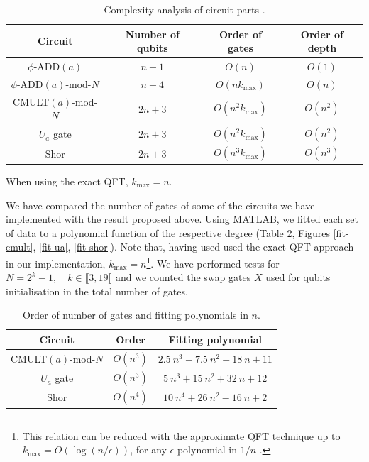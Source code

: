 \documentclass[a4paper, 10pt]{article}
\numberwithin{equation}{section}
\numberwithin{figure}{section}
\numberwithin{table}{section}
\begin{document}
\begin{table}[h!]
	\centering
	\caption{Complexity analysis of circuit parts \cite{beauregard}.}
		\label{table-complexity}
		\begin{tabular}{|c|c|c|c|}
			\hline
			Circuit            		 & Number of qubits & Order of gates & Order of depth \\ \hline
			$\phi$-ADD$(a)$          & $n+1$            & $O(n)$         & $O(1)$         \\ 
			$\phi$-ADD$(a)$-mod-$N$  & $n+4$            & $O(nk_{\max})$   & $O(n)$         \\ 
			CMULT$(a)$-mod-$N$    	 & $2n+3$           & $O(n^2k_{\max})$ & $O(n^2)$       \\ 
			$U_a$ gate            	 & $2n+3$           & $O(n^2k_{\max})$ & $O(n^2)$       \\ 
			Shor                  	 & $2n+3$           & $O(n^3k_{\max})$ & $O(n^3)$       \\ \hline
		\end{tabular}
		When using the exact QFT, $k_{\max}=n$.
\end{table}

We have compared the number of gates of some of the circuits we have implemented with the result proposed above. Using MATLAB, we fitted each set of data to a polynomial function of the respective degree (Table \ref{table-results}, Figures \ref{fit-cmult}, \ref{fit-ua}, \ref{fit-shor}). Note that, having used used the exact QFT approach in our implementation, $k_{\max}=n$\footnote{This relation can be reduced with the approximate QFT technique up to $k_{\max}=O(\log(n/\epsilon))$, for any $\epsilon$ polynomial in $1/n$ \cite{beauregard}.}. We have performed tests for $N=2^{k}-1,\quad k\in\llbracket 3, 19\rrbracket$ and we counted the swap gates $X$ used for qubits initialisation in the total number of gates.

\begin{table}[h!]
	\centering
	\caption{Order of number of gates and fitting polynomials in $n$.}
	\label{table-results}
	\begin{tabular}{|c|c|c|}
		\hline
		Circuit            & Order & Fitting polynomial\\ \hline
		CMULT$(a)$-mod-$N$ & $O(n^3)$ & $2.5\ n^3 + 7.5\ n^2 + 18\ n + 11$ 							 \\ 
		$U_a$ gate         & $O(n^3)$ & $5\ n^3 + 15\ n^2 + 32\ n + 12$       						 \\
		Shor               & $O(n^4)$ & $10\ n^4 + 26\ n^2 - 16\ n + 2$    \\ \hline
	\end{tabular}
\end{table}
\end{document}
